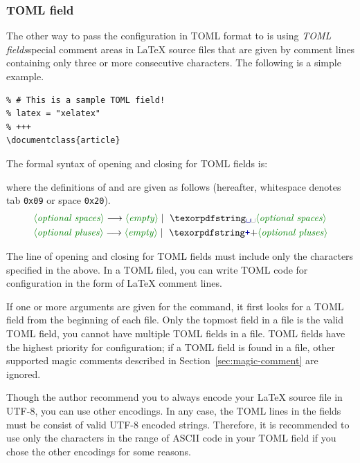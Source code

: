 \documentclass{llmk-doc}
\begin{document}
\subsubsection*{TOML field}

The other way to pass the configuration in TOML format to  is using
\emph{TOML fields}\Dash special comment areas in {\LaTeX} source files that are
given by comment lines containing only three or more consecutive \code{+}
characters. The following is a simple example.
%
\begin{lstlisting}[style=latex]
% +++
% # This is a sample TOML field!
% latex = "xelatex"
% +++
\documentclass{article}
\end{lstlisting}

The formal syntax of opening and closing for TOML fields is:
%
\begin{htcode}
\end{htcode}
%
where the definitions of  and  are
given as follows (hereafter, whitespace \code{\textvisiblespace} denotes tab
\texttt{0x09} or space \texttt{0x20}).
%
\begin{align*}
&\text{\meta{optional spaces}}
  \longrightarrow \text{\meta{empty}}
  \mid\text{\code{\textvisiblespace}\meta{optional spaces}} \\
&\text{\meta{optional pluses}}
  \longrightarrow \text{\meta{empty}}
  \mid\text{\code{+}\meta{optional pluses}}
\end{align*}

The line of opening and closing for TOML fields must include only the
characters specified in the above. In a TOML filed, you can write TOML code for
 configuration in the form of {\LaTeX} comment lines.
%
\begin{htcode}
\end{htcode}

If one or more arguments are given for the  command, it first looks
for a TOML field from the beginning of each file. Only the topmost field in a
file is the valid TOML field, \ie you cannot have multiple TOML fields in a
file. TOML fields have the highest priority for  configuration; if a
TOML field is found in a file, other supported magic comments described in
Section~\ref{sec:magic-comment} are ignored.

Though the author recommend you to always encode your {\LaTeX} source file in
UTF-8, you can use other encodings. In any case, the TOML lines in the fields
must be consist of valid UTF-8 encoded strings. Therefore, it is recommended to
use only the characters in the range of ASCII code in your TOML field if you
chose the other encodings for some reasons.
\end{document}
